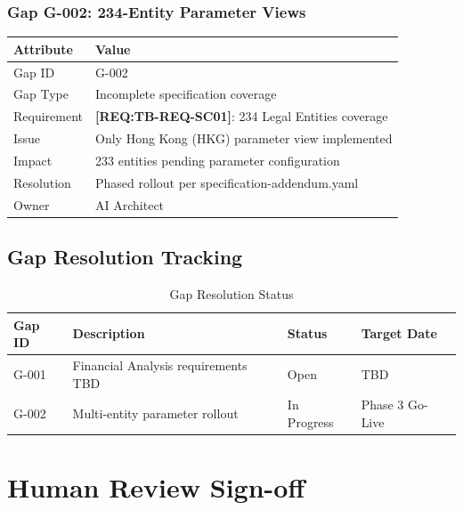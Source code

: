 \documentclass[11pt,a4paper]{article}
\newcommand{\reqref}[1]{\textcolor{reqpurple}{\textbf{[REQ:#1]}}}
\begin{document}
\subsubsection{Gap G-002: 234-Entity Parameter Views}

\begin{table}[h]
\centering
\begin{tabular}{@{}L{4cm}L{10cm}@{}}
\toprule
\textbf{Attribute} & \textbf{Value} \\
\midrule
Gap ID & G-002 \\
Gap Type & Incomplete specification coverage \\
Requirement & \reqref{TB-REQ-SC01}: 234 Legal Entities coverage \\
Issue & Only Hong Kong (HKG) parameter view implemented \\
Impact & 233 entities pending parameter configuration \\
Resolution & Phased rollout per specification-addendum.yaml \\
Owner & AI Architect \\
\bottomrule
\end{tabular}
\end{table}

\subsection{Gap Resolution Tracking}

\begin{table}[h]
\centering
\caption{Gap Resolution Status}
\begin{tabular}{@{}C{1.5cm}L{6cm}C{2.5cm}C{3cm}@{}}
\toprule
\textbf{Gap ID} & \textbf{Description} & \textbf{Status} & \textbf{Target Date} \\
\midrule
G-001 & Financial Analysis requirements TBD & Open & TBD \\
G-002 & Multi-entity parameter rollout & In Progress & Phase 3 Go-Live \\
\bottomrule
\end{tabular}
\end{table}


\newpage
\section{Human Review Sign-off}
\end{document}
